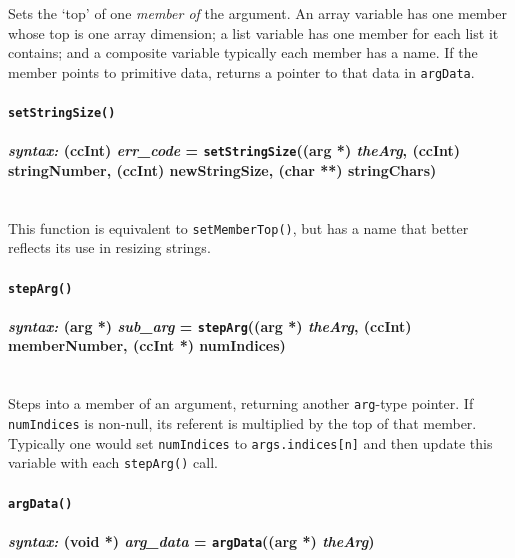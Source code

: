 \documentclass{article}
\begin{document}
Sets the `top' of one \emph{member of} the argument.  An array variable has one member whose top is one array dimension; a list variable has one member for each list it contains; and a composite variable typically each member has a name.  If the member points to primitive data, returns a pointer to that data in \verb#argData#.\\



\paragraph{\texttt{setStringSize()}\\\\
\normalfont \emph{syntax: } (ccInt) \emph{err\_code} = \texttt{setStringSize}((arg *) \emph{theArg}, (ccInt) stringNumber, (ccInt) newStringSize, (char **) stringChars)\\\\}

This function is equivalent to \verb#setMemberTop()#, but has a name that better reflects its use in resizing strings.


\paragraph{\texttt{stepArg()}\\\\
\normalfont \emph{syntax: } (arg *) \emph{sub\_arg} = \texttt{stepArg}((arg *) \emph{theArg}, (ccInt) memberNumber, (ccInt *) numIndices)\\\\}

Steps into a member of an argument, returning another \verb#arg#-type pointer.  If \verb#numIndices# is non-null, its referent is multiplied by the top of that member.  Typically one would set \verb#numIndices# to \verb#args.indices[n]# and then update this variable with each \verb#stepArg()# call.\\



\paragraph{\texttt{argData()}\\\\
\normalfont \emph{syntax: } (void *) \emph{arg\_data} = \texttt{argData}((arg *) \emph{theArg})\\\\}
\end{document}
